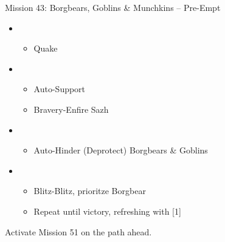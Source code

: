 \begin{battle}{{Mission 43: Borgbears, Goblins \& Munchkins -- Pre-Empt}}
	\begin{itemize}
		\item \second
			\begin{itemize}
				\item Quake
			\end{itemize}
		\item \fifth
			\begin{itemize}
				\item Auto-Support
				\item Bravery-Enfire Sazh
			\end{itemize}
		\item \sixth
			\begin{itemize}
				\item Auto-Hinder (Deprotect) Borgbears \& Goblins
			\end{itemize}
		\item \second
			\begin{itemize}
				\item Blitz-Blitz, prioritze Borgbear
				\item Repeat until victory, refreshing with [1]
			\end{itemize}
	\end{itemize}
\end{battle}

Activate Mission 51 on the path ahead.

